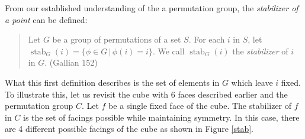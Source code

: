 \documentclass[11pt,twoside]{article}
\begin{document}
From our established understanding of the a permutation group, the \emph{stabilizer of a point} can be defined:
\begin{quote}
Let $G$ be a group of permutations of a set $S$.  For each $i$ in $S$, let $\operatorname{stab}_G(i) = \{ \phi \in G\, | \, \phi(i) = i \}$.  We call $\operatorname{stab}_G(i)$ the \emph{stabilizer} of $i$ in $G$. (Gallian 152)
\end{quote}
What this first definition describes is the set of elements in $G$ which leave $i$ fixed. To illustrate this, let us revisit the cube with 6 faces described earlier and the permutation group $C$. Let $f$ be a single fixed face of the cube.  The stabilizer of $f$ in $C$ is the set of facings possible while maintaining symmetry.  In this case, there are 4 different possible facings of the cube as shown in Figure \ref{stab}.
\end{document}
